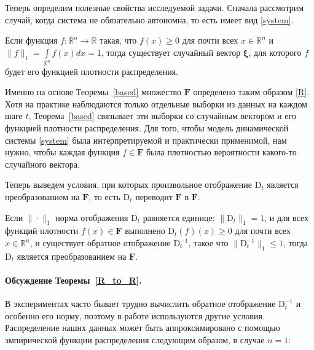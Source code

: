         Теперь определим полезные свойства исследуемой задачи. Сначала рассмотрим случай, когда система не обязательно автономна, то есть имеет вид \eqref{system}.

        \begin{theorem} \label{based}
            Если функция $f: \mathbb{R}^n \to \mathbb{R}$ такая, что $f(x) \geq 0$ для почти всех $x \in \mathbb{R}^n$ и $\|f\|_1 = \int\limits_{\mathbb{R}^n} f(x) dx = 1$, тогда существует случайный вектор $\mathbf{\xi}$, для которого $f$ будет его функцией плотности распределения.
        \end{theorem}

        Именно на основе Теоремы~\ref{based} множество $\textbf{F}$ определено таким образом \eqref{R}. Хотя на практике наблюдаются только отдельные выборки из данных на каждом шаге $t$, Теорема~\ref{based} связывает эти выборки со случайным вектором и его функцией плотности распределения. Для того, чтобы модель динамической системы \eqref{system} была интерпретируемой и практически применимой, нам нужно, чтобы каждая функция $f \in \textbf{F}$ была плотностью вероятности какого-то случайного вектора. 

        Теперь выведем условия, при которых произвольное отображение $\text{D}_t$ является преобразованием на $\textbf{F}$, то есть $\text{D}_t$ переводит $\textbf{F}$ в $\textbf{F}$.

        \begin{theorem}[Веприков, 2023] \label{R_to_R}
            Если $\| \cdot \|_1$ норма отображения $\text{D}_t$ равняется единице: $\| \text{D}_t \|_1 = 1$, и для всех функций плотности $f(x) \in \textbf{F}$ выполнено $\text{D}_t(f)(x) \geq 0$ для почти всех $x \in \mathbb{R}^n$, и существует обратное отображение $\text{D}_t^{-1}$, такое что $\|\text{D}_t^{-1}\|_1 \leq 1$, тогда $\text{D}_t$ является преобразованием на $\textbf{F}$.
        \end{theorem}

        \paragraph{Обсуждение Теоремы~\ref{R_to_R}.} В экспериментах часто бывает трудно вычислить обратное отображение $\text{D}_t^{-1}$ и особенно его норму, поэтому в работе используются другие условия. 
        Распределение наших данных может быть аппроксимировано с помощью эмпирической функции распределения \citep{dvoretzky1956asymptotic} следующим образом, в случае $n=1$:

